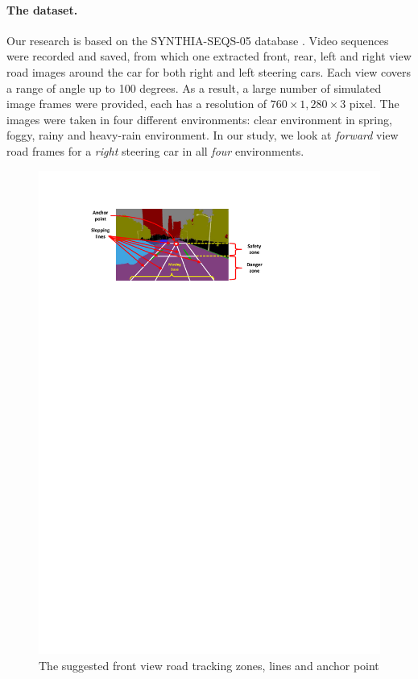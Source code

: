 \documentclass{svproc}
\begin{document}
	\paragraph{The dataset.} Our research is based on the SYNTHIA-SEQS-05 database \cite{Ros2016TheSYNTHIA}. Video sequences were recorded and saved, from which one extracted front, rear, left and right view road images around the car for both right and left steering cars. Each view covers a range of angle up to 100 degrees. As a result, a large number of simulated image frames were provided, each has a resolution of $760 \times 1,280 \times 3$ pixel. The images were taken in four different environments: clear environment in spring, foggy, rainy and heavy-rain  environment. In our study, we look at \emph{forward} view road frames for a \emph{right} steering car in all \emph{four} environments. 
	\begin{figure}[!ht]
		\centering
		\includegraphics[scale=.7,trim=3cm 22.5cm 7.1cm 2cm,clip]{segmentation_regions2.pdf}
		\vspace{-4ex}\caption{The suggested front view road tracking zones, lines and anchor point}
		\label{Fig:segmentation_regions1}\vspace{-0.5cm}
	\end{figure}
\end{document}
